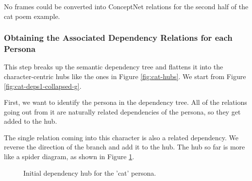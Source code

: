 No frames could be converted into ConceptNet relations for the second half of the cat poem example.

\subsubsection{Obtaining the Associated Dependency Relations for each Persona}

This step breaks up the semantic dependency tree and flattens it into the character-centric hubs like the ones in Figure \ref{fig:cat-hubs}. We start from Figure \ref{fig:cat-deps1-collapsed-g}.

First, we want to identify the persona in the dependency tree. All of the relations going out from it are naturally related dependencies of the persona, so they get added to the hub.

The single relation coming into this character is also a related dependency. We reverse the direction of the branch and add it to the hub. The hub so far is more like a spider diagram, as shown in Figure \ref{fig:cat-in-out-deps}.

\begin{figure}[H]
    \centering
    \caption{Initial dependency hub for the 'cat' persona.}
    \label{fig:cat-in-out-deps}
\end{figure}%

